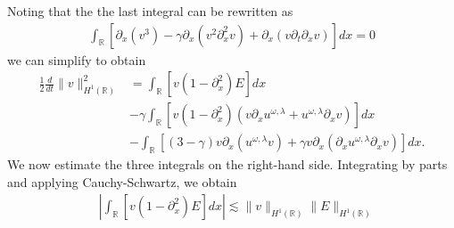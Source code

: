 \documentclass{beamer}
\newcommand{\rr}{\mathbb{R}}
\newcommand{\p}{\partial}
\begin{document}
\begin{frame}
Noting that the the last integral can be rewritten as 
\begin{equation*}
	\begin{split}
	\int_{\rr} \left[ \p_x (v^3) - \gamma \p_x (v^2 \p_x^2 v) + \p_x\left( v \p_t
	\p_x v
	\right) \right]dx  = 0
\end{split}
\end{equation*}
%
we can simplify to obtain
%
%
\begin{equation*}
\label{appleenergy-est}
\begin{split}
\frac{1}{2} \frac{d}{dt} \|v\|_{H^1(\rr)}^2  
& = 
 \int_{\rr} \left[ v(1-\p_x^2)E \right]dx\\
 &-
 \gamma \int_{\rr} \left[ v(1-\p_x^2)(v\p_x u^{\omega,\lambda} + 
u^{\omega,\lambda} \p_x v) \right]dx
\\
&- \int_{\rr}\left[ \left( 3-\gamma \right)v \p_x\left( u^{\omega,\lambda}v 
\right) + \gamma v
\p_x \left( \p_x u^{\omega,\lambda} \p_x v \right)\right]dx.
\end{split}
\end{equation*}
%
%
\pause
We now estimate the three integrals on the right-hand side. Integrating by parts and applying Cauchy-Schwartz,  
we obtain
%
%
%
\begin{equation*}
	\begin{split}
\label{applefirst_piece}
& \left |\int_{\rr} \left [v (1- \p_x^2)E \right ] dx \right |
 \lesssim
\|v\|_{H^1(\rr)} \|E\|_{H^1(\rr)}
\end{split}
\end{equation*}
\end{frame}
%
%
\end{document}
